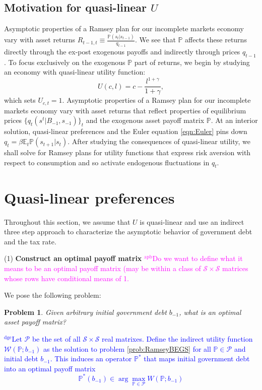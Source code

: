 \documentclass[12pt]{article}
\newcommand{\dge}[1]{\textcolor{blue}{$^{\textrm{dge}}${#1}}}
\newcommand{\apb}[1]{\textcolor{magenta}{$^{\textrm{apb}}${#1}}}
\newtheorem{problem}[theorem]{Problem}
\begin{document}
\subsection{Motivation for  quasi-linear $U$\label{sec:excusequasilinear}}
Asymptotic properties of a Ramsey plan for our incomplete markets economy vary  with asset returns $R_{t-1,t}\equiv \frac{\mathbb{P}(s_{t}|s_{t-1})}{q_{t-1}}$. We see that $\mathbb{P}$ affects these returns directly through the ex-post exogenous payoffs and indirectly through prices $q_{t-1}$. To focus exclusively on the exogenous $\mathbb{P}$ part of returns, we begin  by studying an economy with  quasi-linear  utility function:
  \begin{equation}\label{eqn:UQL}
U(c,l)=c-\frac{l^{1+\gamma}}{1+\gamma},\end{equation} which sets $U_{c,t}= 1$.  Asymptotic properties of a Ramsey plan for our incomplete markets economy vary  with   asset returns that reflect
	properties of equilibrium prices $\{q_t(s^t|B_{-1},s_{-1})\}_t$ and the exogenous asset payoff matrix $\mathbb{P}$.
At an interior solution, quasi-linear preferences and the Euler equation \eqref{eqn:Euler} pins down $q_t=\beta \mathbb{E}_t
\mathbb{P}(s_{t+1}|s_t)$.  After studying the consequences of quasi-linear utility, we shall solve for Ramsey plans for utility functions that express risk aversion with respect to consumption and so activate endogenous fluctuations in $q_t$.
	


\section{Quasi-linear preferences}

Throughout this section, we assume that $U$ is quasi-linear and use an indirect three step approach to  characterize  the asymptotic behavior of government  debt and the tax rate.



\noindent (1) \textbf{Construct  an optimal payoff matrix}
\apb{Do we want to define what it means to be an optimal payoff matrix (may be within a class of $\mathcal{S}\times\mathcal{S}$ matrices whose rows have conditional means of 1.}

We pose the following problem:
\begin{problem}\label{prob:PPoperator}
 Given arbitrary initial government debt $b_{-1}$, what is an optimal asset payoff matrix?
\end{problem}
\noindent  \dge{Let $\mathcal P$ be the set of all $\mathcal S\times \mathcal S$ real matrixes.  Define the indirect utility function $\mathcal W(\mathbb P;b_{-1})$ as the solution to problem \ref{prob:RamseyBEGS} for all $\mathbb P \in \mathcal P$ and initial debt $b_{-1}$.  This induces an operator $\mathbb P^*$ that maps initial government debt into an optimal payoff matrix 
\[
	\mathbb P^*(b_{-1}) \in \arg\max_{\mathbb P\in \mathcal P} W(\mathbb P; b_{-1})
\] }
\end{document}
